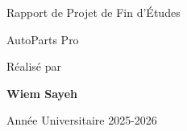 \begin{titlepage}

\centering

{\Huge Rapport de Projet de Fin d'Études}

\vspace{2cm}

{\Large AutoParts Pro}

\vfill

Réalisé par

\textbf{Wiem Sayeh}

\vspace{1cm}

Année Universitaire 2025-2026

\end{titlepage}
